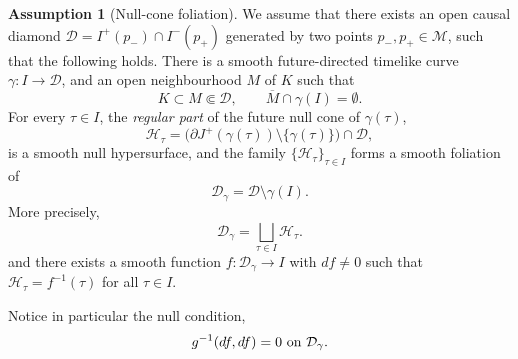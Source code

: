 \documentclass[12pt,reqno]{amsart}
\numberwithin{equation}{section}
\theoremstyle{definition}
\theoremstyle{plain}
\theoremstyle{definition}
\theoremstyle{definition}
\newtheorem{assumption}[theorem]{Assumption}
\newcommand{\M}{\mathcal{M}}
\newcommand{\D}{\mathcal{D}}
\newcommand{\dg}{\D_\gamma}
\newcommand{\uu}{M}
\begin{document}
\begin{assumption}[Null-cone foliation]
\label{assumption_null_cone_foliation}
We assume that there exists an open causal diamond $\mathcal{D} = I^+(p_-) \cap I^-(p_+)$ generated by two points $p_-, p_+ \in \M$, such that the following holds. There is a smooth future-directed timelike curve $\gamma \colon I \to \mathcal{D}$,
and an open neighbourhood $\uu$ of $K$ such that
\[
  K \subset \uu \Subset \mathcal{D},
  \qquad
  \overline{\uu} \cap \gamma(I) = \emptyset.
\]
For every $\tau \in I$, the \emph{regular part} of the future null
cone of $\gamma(\tau)$,
\[
  \mathcal{H}_\tau
  =
  \bigl(\partial J^+(\gamma(\tau)) \setminus \{\gamma(\tau)\}\bigr)
  \cap \mathcal{D},
\]
is a smooth null hypersurface, and the family
$\{\mathcal{H}_\tau\}_{\tau \in I}$ forms a smooth foliation of
\begin{equation}
    \label{def_of_dgamma}
\dg=\mathcal{D} \setminus \gamma(I).
\end{equation}
More precisely,
\[
  \dg = \bigsqcup_{\tau \in I} \mathcal{H}_\tau.
\]
and there exists a smooth function $f \colon \dg
\to I$ with $df \neq 0$ such that $\mathcal{H}_\tau = f^{-1}(\tau)$
for all $\tau \in I$.
\end{assumption}
Notice in particular the null condition,
\begin{equation}
\label{eq:null-cond}
g^{-1}(df,df) = 0  \textnormal{ on } \dg.
\end{equation}
\end{document}
